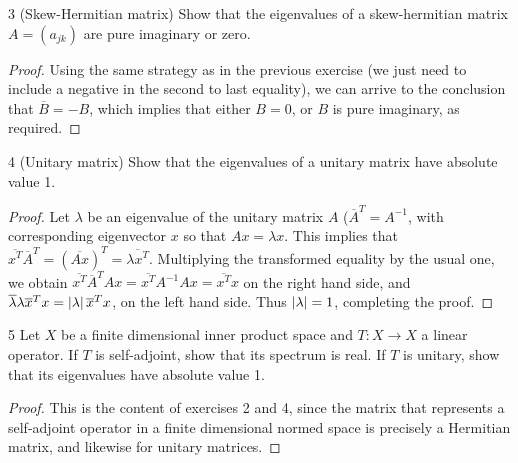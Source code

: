 \begin{exercise}{3 (Skew-Hermitian matrix)}
Show that the eigenvalues of a skew-hermitian matrix $A = (a_{jk})$ are pure imaginary or zero.
\end{exercise}
\begin{proof}
Using the same strategy as in the previous exercise (we just need to include a negative in the second to last equality), we can arrive to the conclusion that $\overline{B} = -B$, which implies that either $B = 0$, or $B$ is pure imaginary, as required.
\end{proof} 

\begin{exercise}{4 (Unitary matrix)}
Show that the eigenvalues of a unitary matrix have absolute value 1.
\end{exercise}
\begin{proof}
Let $\lambda$ be an eigenvalue of the unitary matrix $A$ ($\overline{A}^T = A^{-1}$, with corresponding eigenvector $x$ so that $A x = \lambda x$.
This implies that $\overline{x^T} \overline{A}^T = (\overline{A x})^T = \overline{\lambda x^T}$.
Multiplying the transformed equality by the usual one, we obtain $\overline{x^T} \overline{A}^T A x = \overline{x^T} A^{-1} A x = \overline{x^T} x$ on the right hand side, and $\overline{\lambda} \lambda \overline{x}^T x = \left\lvert \lambda\right\rvert \overline{x}^T x$, on the left hand side.
Thus $\left\lvert \lambda\right\rvert = 1$, completing the proof.
\end{proof} 

\begin{exercise}{5}
Let $X$ be a finite dimensional inner product space and $T: X \to X$ a linear operator.
If $T$ is self-adjoint, show that its spectrum is real.
If $T$ is unitary, show that its eigenvalues have absolute value 1.
\end{exercise}
\begin{proof}
This is the content of exercises 2 and 4, since the matrix that represents a self-adjoint operator in a finite dimensional normed space is precisely a Hermitian matrix, and likewise for unitary matrices.
\end{proof} 

